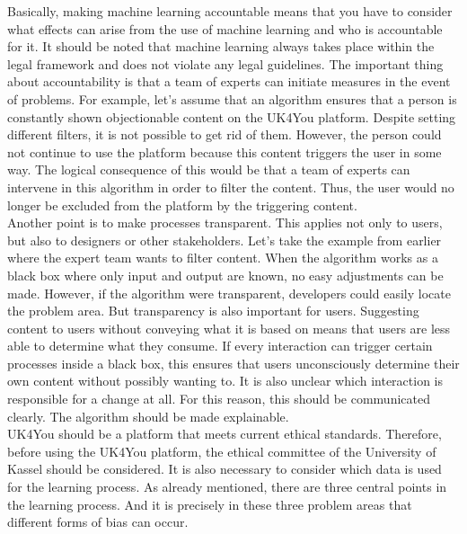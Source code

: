 Basically, making machine learning accountable means that you have to consider what effects can arise from the use of machine learning and who is accountable for it.
It should be noted that machine learning always takes place within the legal framework and does not violate any legal guidelines.
The important thing about accountability is that a team of experts can initiate measures in the event of problems.
For example, let's assume that an algorithm ensures that a person is constantly shown objectionable content on the UK4You platform.
Despite setting different filters, it is not possible to get rid of them.
However, the person could not continue to use the platform because this content triggers the user in some way.
The logical consequence of this would be that a team of experts can intervene in this algorithm in order to filter the content.
Thus, the user would no longer be excluded from the platform by the triggering content.\\

Another point is to make processes transparent. 
This applies not only to users, but also to designers or other stakeholders.
Let's take the example from earlier where the expert team wants to filter content.
When the algorithm works as a black box where only input and output are known, no easy adjustments can be made.
However, if the algorithm were transparent, developers could easily locate the problem area.
But transparency is also important for users. 
Suggesting content to users without conveying what it is based on means that users are less able to determine what they consume.
If every interaction can trigger certain processes inside a black box, this ensures that users unconsciously determine their own content without possibly wanting to.
It is also unclear which interaction is responsible for a change at all.
For this reason, this should be communicated clearly. 
The algorithm should be made explainable.\\

UK4You should be a platform that meets current ethical standards.
Therefore, before using the UK4You platform, the ethical committee of the University of Kassel should be considered.
It is also necessary to consider which data is used for the learning process.
As already mentioned, there are three central points in the learning process.
And it is precisely in these three problem areas that different forms of bias can occur.\\

